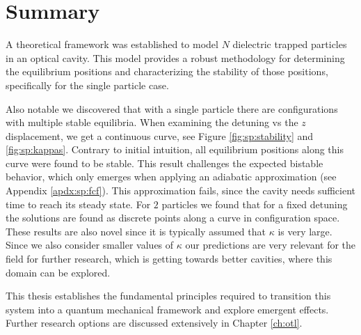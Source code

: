 \chapter{Summary}
\label{ch:sum}

A theoretical framework was established to model $N$ dielectric trapped particles in an optical cavity.
This model provides a robust methodology for determining the equilibrium positions 
    and characterizing the stability of those positions, specifically for the single particle case.

Also notable we discovered that with a single particle there are configurations with multiple stable equilibria. 
When examining the detuning vs the $z$ displacement, 
    we get a continuous curve, see Figure \ref{fig:sp:stability} and \ref{fig:sp:kappas}.
Contrary to initial intuition,
    all equilibrium positions along this curve were found to be stable.
This result challenges the expected bistable behavior,
    which only emerges when applying an adiabatic approximation (see Appendix \ref{apdx:sp:fcf}).
This approximation fails, 
    since the cavity needs sufficient time to reach its steady state.
For $2$ particles we found that for a fixed detuning the solutions are found as discrete points along a curve in configuration space. 
These results are also novel 
    since it is typically assumed that $\kappa$ is very large.
Since we also consider smaller values of $\kappa$ our predictions are very relevant for the field for further research,
    which is getting towards better cavities, 
    where this domain can be explored.

This thesis establishes the fundamental principles required to transition this system into a quantum mechanical framework and explore emergent effects.
Further research options are discussed extensively in Chapter \ref{ch:otl}.